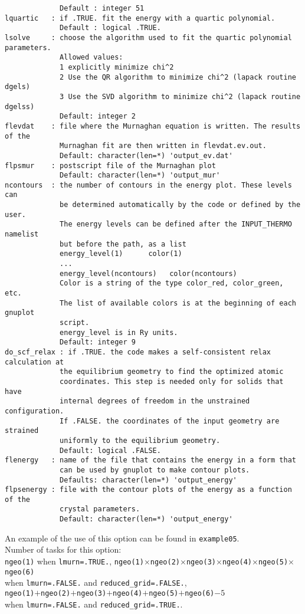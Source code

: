 \documentclass[12pt,a4paper]{article}
\begin{document}
\begin{verbatim}
             Default : integer 51
lquartic   : if .TRUE. fit the energy with a quartic polynomial.
             Default : logical .TRUE.
lsolve     : choose the algorithm used to fit the quartic polynomial parameters.
             Allowed values:
             1 explicitly minimize chi^2
             2 Use the QR algorithm to minimize chi^2 (lapack routine dgels)
             3 Use the SVD algorithm to minimize chi^2 (lapack routine dgelss)
             Default: integer 2
flevdat    : file where the Murnaghan equation is written. The results of the
             Murnaghan fit are then written in flevdat.ev.out.
             Default: character(len=*) 'output_ev.dat'
flpsmur    : postscript file of the Murnaghan plot
             Default: character(len=*) 'output_mur'
ncontours  : the number of contours in the energy plot. These levels can
             be determined automatically by the code or defined by the user.
             The energy levels can be defined after the INPUT_THERMO namelist 
             but before the path, as a list
             energy_level(1)      color(1)
             ...
             energy_level(ncontours)   color(ncontours) 
             Color is a string of the type color_red, color_green, etc.
             The list of available colors is at the beginning of each gnuplot
             script.
             energy_level is in Ry units.
             Default: integer 9
do_scf_relax : if .TRUE. the code makes a self-consistent relax calculation at
             the equilibrium geometry to find the optimized atomic 
             coordinates. This step is needed only for solids that have 
             internal degrees of freedom in the unstrained configuration. 
             If .FALSE. the coordinates of the input geometry are strained 
             uniformly to the equilibrium geometry.
             Default: logical .FALSE. 
flenergy   : name of the file that contains the energy in a form that
             can be used by gnuplot to make contour plots.
             Defaults: character(len=*) 'output_energy'
flpsenergy : file with the contour plots of the energy as a function of the
             crystal parameters.
             Default: character(len=*) 'output_energy'
\end{verbatim}
An example of the use of this option can be found in \texttt{example05}.\\
Number of tasks for this option: \\
\texttt{ngeo(1)} when \texttt{lmurn=.TRUE.}, 
\texttt{ngeo(1)}$\times$\texttt{ngeo(2)}$\times$\texttt{ngeo(3)}$\times$\texttt{ngeo(4)}$\times$\texttt{ngeo(5)}$\times$\texttt{ngeo(6)} \\ when 
\texttt{lmurn=.FALSE.} and 
\texttt{reduced\_grid=.FALSE.}, \\
\texttt{ngeo(1)}$+$\texttt{ngeo(2)}$+$\texttt{ngeo(3)}$+$\texttt{ngeo(4)}$+$\texttt{ngeo(5)}$+$\texttt{ngeo(6)}$-5$ \\
when \texttt{lmurn=.FALSE.} and \texttt{reduced\_grid=.TRUE.}.
\end{document}
